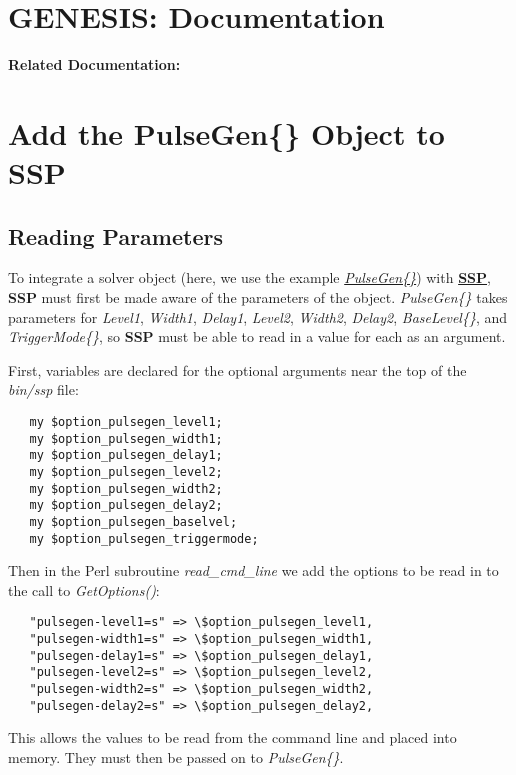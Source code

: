 \documentclass[12pt]{article}
\begin{document}
\section*{GENESIS: Documentation}

{\bf Related Documentation:}

\section*{Add the PulseGen\{\} Object to SSP}

\subsection*{Reading Parameters}

To integrate a solver object (here, we use the example \href{../genesis-add-object-solver/genesis-add-object-solver.tex}{\it PulseGen\{\}}) with \href{../ssp/ssp.tex}{\bf SSP}, {\bf SSP} must first be made aware of the parameters of the object. {\it PulseGen\{\}} takes parameters for {\it Level1}, {\it Width1}, {\it Delay1}, {\it Level2}, {\it Width2}, {\it Delay2}, {\it BaseLevel\{\}}, and {\it TriggerMode\{\}}, so {\bf SSP} must be able to read in a value for each as an argument.

First, variables are declared for the optional arguments near the top of the {\it bin/ssp} file:
\begin{verbatim}
   my $option_pulsegen_level1;
   my $option_pulsegen_width1;
   my $option_pulsegen_delay1;
   my $option_pulsegen_level2;
   my $option_pulsegen_width2;
   my $option_pulsegen_delay2;
   my $option_pulsegen_baselvel;
   my $option_pulsegen_triggermode;
\end{verbatim}
Then in the Perl subroutine {\it read\_cmd\_line} we add the options to be read in to the call to {\it GetOptions()}:
\begin{verbatim}
   "pulsegen-level1=s" => \$option_pulsegen_level1,
   "pulsegen-width1=s" => \$option_pulsegen_width1,
   "pulsegen-delay1=s" => \$option_pulsegen_delay1,
   "pulsegen-level2=s" => \$option_pulsegen_level2,
   "pulsegen-width2=s" => \$option_pulsegen_width2,
   "pulsegen-delay2=s" => \$option_pulsegen_delay2,
\end{verbatim}
This allows the values to be read from the command line and placed into memory. They must then be passed on to {\it PulseGen\{\}}.
\end{document}
